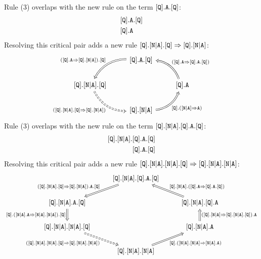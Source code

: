 \documentclass[../generics]{subfiles}
\begin{document}
Rule (3) overlaps with the new rule on the term $[\texttt{Q}].\texttt{A}.[\texttt{Q}]$:
\begin{align*}
&[\texttt{Q}].\texttt{A}.[\texttt{Q}]\\
&[\texttt{Q}].\texttt{A}
\end{align*}
Resolving this critical pair adds a new rule $[\texttt{Q}].[\texttt{N}|\texttt{A}].[\texttt{Q}]\Rightarrow[\texttt{Q}].[\texttt{N}|\texttt{A}]$:
\[
\FourLoopDerived%
{\protosym{Q}.\texttt{A}.\protosym{Q}}%
{\protosym{Q}.\assocsym{N}{A}.\protosym{Q}}%
{\protosym{Q}.\assocsym{N}{A}}%
{\protosym{Q}.\texttt{A}}%
{(\protosym{Q}.\texttt{A}\Rightarrow\protosym{Q}.\assocsym{N}{A}).\protosym{Q}}%
{(\protosym{Q}.\assocsym{N}{A}.\protosym{Q}\Rightarrow\protosym{Q}.\assocsym{N}{A})}%
{\protosym{Q}.(\assocsym{N}{A}\Rightarrow\texttt{A})}%
{(\protosym{Q}.\texttt{A}\Rightarrow\protosym{Q}.\texttt{A}.\protosym{Q})}
\]
Rule (3) overlaps with the new rule on the term $[\texttt{Q}].[\texttt{N}|\texttt{A}].[\texttt{Q}].\texttt{A}.[\texttt{Q}]$:
\begin{align*}
[\texttt{Q}].[\texttt{N}|\texttt{A}].&[\texttt{Q}].\texttt{A}.[\texttt{Q}]\\
&[\texttt{Q}].\texttt{A}.[\texttt{Q}]
\end{align*}
Resolving this critical pair adds a new rule $[\texttt{Q}].[\texttt{N}|\texttt{A}].[\texttt{N}|\texttt{A}].[\texttt{Q}]\Rightarrow[\texttt{Q}].[\texttt{N}|\texttt{A}].[\texttt{N}|\texttt{A}]$:
\[
\begin{tikzcd}
&\protosym{Q}.\assocsym{N}{A}.\protosym{Q}.\texttt{A}.\protosym{Q}\arrow[ld, Rightarrow, "(\protosym{Q}.\assocsym{N}{A}.\protosym{Q}\Rightarrow\protosym{Q}.\assocsym{N}{A}).\texttt{A}.\protosym{Q}"']&\\
\protosym{Q}.\assocsym{N}{A}.\texttt{A}.\protosym{Q}\arrow[d, Rightarrow, "\protosym{Q}.(\assocsym{N}{A}.\texttt{A}\Rightarrow\assocsym{N}{A}.\assocsym{N}{A}).\protosym{Q}"']&&
\protosym{Q}.\assocsym{N}{A}.\protosym{Q}.\texttt{A}\arrow[ul, Rightarrow, "\protosym{Q}.\assocsym{N}{A}.(\protosym{Q}.\texttt{A}\Rightarrow\protosym{Q}.\texttt{A}.\protosym{Q})"']\\
\protosym{Q}.\assocsym{N}{A}.\assocsym{N}{A}.\protosym{Q}\arrow[rd, Rightarrow, dashed, "(\protosym{Q}.\assocsym{N}{A}.\assocsym{N}{A}.\protosym{Q}\Rightarrow\protosym{Q}.\assocsym{N}{A}.\assocsym{N}{A})"']&&
\protosym{Q}.\assocsym{N}{A}.\texttt{A}\arrow[u, Rightarrow, "(\protosym{Q}.\assocsym{N}{A}\Rightarrow\protosym{Q}.\assocsym{N}{A}.\protosym{Q}).\texttt{A}"']\\
&\protosym{Q}.\assocsym{N}{A}.\assocsym{N}{A}\arrow[ru, Rightarrow, "\protosym{Q}.(\assocsym{N}{A}.\assocsym{N}{A}\Rightarrow\assocsym{N}{A}.\texttt{A})"']
\end{tikzcd}
\]
\end{document}
